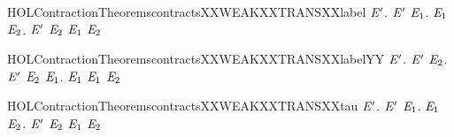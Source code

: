\begin{SaveVerbatim}{HOLContractionTheoremscontractsXXWEAKXXTRANSXXlabel}
\HOLTokenTurnstile{} \HOLSymConst{\HOLTokenForall{}} \ensuremath{\HOLBoundVar{E}\sp{\prime}}.
         \ensuremath{\HOLBoundVar{E}\sp{\prime}} \HOLSymConst{\HOLTokenImp{}}
       \HOLSymConst{\HOLTokenForall{}} \ensuremath{\HOLBoundVar{E}\sb{\mathrm{1}}}.
            \HOLTokenWeakTransBegin{} \HOLTokenWeakTransEnd \ensuremath{\HOLBoundVar{E}\sb{\mathrm{1}}} \HOLSymConst{\HOLTokenImp{}}
           \HOLSymConst{\HOLTokenExists{}}\ensuremath{\HOLBoundVar{E}\sb{\mathrm{2}}}. \ensuremath{\HOLBoundVar{E}\sp{\prime}} \HOLTokenWeakTransBegin{} \HOLTokenWeakTransEnd \ensuremath{\HOLBoundVar{E}\sb{\mathrm{2}}} \HOLSymConst{\HOLTokenConj{}} \ensuremath{\HOLBoundVar{E}\sb{\mathrm{1}}}  \ensuremath{\HOLBoundVar{E}\sb{\mathrm{2}}}
\end{SaveVerbatim}
\newcommand{\HOLContractionTheoremscontractsXXWEAKXXTRANSXXlabel}{\UseVerbatim{HOLContractionTheoremscontractsXXWEAKXXTRANSXXlabel}}
\begin{SaveVerbatim}{HOLContractionTheoremscontractsXXWEAKXXTRANSXXlabelYY}
\HOLTokenTurnstile{} \HOLSymConst{\HOLTokenForall{}} \ensuremath{\HOLBoundVar{E}\sp{\prime}}.
         \ensuremath{\HOLBoundVar{E}\sp{\prime}} \HOLSymConst{\HOLTokenImp{}}
       \HOLSymConst{\HOLTokenForall{}} \ensuremath{\HOLBoundVar{E}\sb{\mathrm{2}}}.
           \ensuremath{\HOLBoundVar{E}\sp{\prime}} \HOLTokenWeakTransBegin{} \HOLTokenWeakTransEnd \ensuremath{\HOLBoundVar{E}\sb{\mathrm{2}}} \HOLSymConst{\HOLTokenImp{}}
           \HOLSymConst{\HOLTokenExists{}}\ensuremath{\HOLBoundVar{E}\sb{\mathrm{1}}}.  \HOLTokenWeakTransBegin{} \HOLTokenWeakTransEnd \ensuremath{\HOLBoundVar{E}\sb{\mathrm{1}}} \HOLSymConst{\HOLTokenConj{}}  \ensuremath{\HOLBoundVar{E}\sb{\mathrm{1}}} \ensuremath{\HOLBoundVar{E}\sb{\mathrm{2}}}
\end{SaveVerbatim}
\newcommand{\HOLContractionTheoremscontractsXXWEAKXXTRANSXXlabelYY}{\UseVerbatim{HOLContractionTheoremscontractsXXWEAKXXTRANSXXlabelYY}}
\begin{SaveVerbatim}{HOLContractionTheoremscontractsXXWEAKXXTRANSXXtau}
\HOLTokenTurnstile{} \HOLSymConst{\HOLTokenForall{}} \ensuremath{\HOLBoundVar{E}\sp{\prime}}.
         \ensuremath{\HOLBoundVar{E}\sp{\prime}} \HOLSymConst{\HOLTokenImp{}}
       \HOLSymConst{\HOLTokenForall{}}\ensuremath{\HOLBoundVar{E}\sb{\mathrm{1}}}.  \HOLTokenWeakTransBegin\HOLConst{\ensuremath{\tau}}\HOLTokenWeakTransEnd \ensuremath{\HOLBoundVar{E}\sb{\mathrm{1}}} \HOLSymConst{\HOLTokenImp{}} \HOLSymConst{\HOLTokenExists{}}\ensuremath{\HOLBoundVar{E}\sb{\mathrm{2}}}.  \ensuremath{\HOLBoundVar{E}\sp{\prime}} \ensuremath{\HOLBoundVar{E}\sb{\mathrm{2}}} \HOLSymConst{\HOLTokenConj{}} \ensuremath{\HOLBoundVar{E}\sb{\mathrm{1}}}  \ensuremath{\HOLBoundVar{E}\sb{\mathrm{2}}}
\end{SaveVerbatim}
